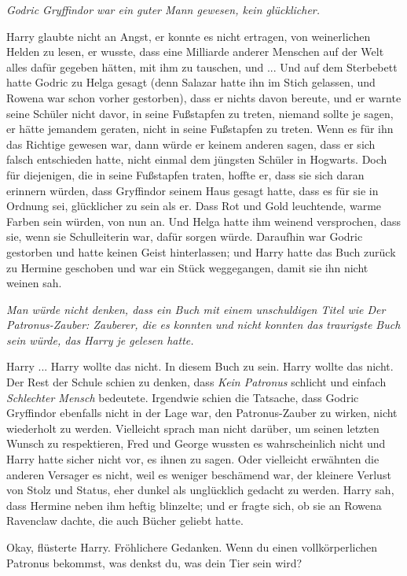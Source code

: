 \emph{Godric Gryffindor war ein guter Mann gewesen, kein glücklicher.}

Harry glaubte nicht an Angst, er konnte es nicht ertragen, von weinerlichen
Helden zu lesen, er wusste, dass eine Milliarde anderer Menschen auf der Welt
alles dafür gegeben hätten, mit ihm zu tauschen, und ... Und auf dem Sterbebett
hatte Godric zu Helga gesagt (denn Salazar hatte ihn im Stich gelassen, und
Rowena war schon vorher gestorben), dass er nichts davon bereute, und er warnte
seine Schüler nicht davor, in seine Fußstapfen zu treten, niemand sollte je
sagen, er hätte jemandem geraten, nicht in seine Fußstapfen zu treten. Wenn es
für ihn das Richtige gewesen war, dann würde er keinem anderen sagen, dass er
sich falsch entschieden hatte, nicht einmal dem jüngsten Schüler in Hogwarts.
Doch für diejenigen, die in seine Fußstapfen traten, hoffte er, dass sie sich
daran erinnern würden, dass Gryffindor seinem Haus gesagt hatte, dass es für sie
in Ordnung sei, glücklicher zu sein als er. Dass Rot und Gold leuchtende, warme
Farben sein würden, von nun an. Und Helga hatte ihm weinend versprochen, dass
sie, wenn sie Schulleiterin war, dafür sorgen würde. Daraufhin war Godric
gestorben und hatte keinen Geist hinterlassen; und Harry hatte das Buch zurück
zu Hermine geschoben und war ein Stück weggegangen, damit sie ihn nicht weinen
sah.

\emph{Man würde nicht denken, dass ein Buch mit einem unschuldigen Titel wie
\glqq{}Der Patronus-Zauber: Zauberer, die es konnten und nicht konnten\grqq{} das
traurigste Buch sein würde, das Harry je gelesen hatte.}

Harry ... Harry wollte das nicht. In diesem Buch zu sein. Harry wollte das nicht.
Der Rest der Schule schien zu denken, dass \glqq{}\emph{Kein Patronus}\grqq{}
schlicht und einfach \glqq{}\emph{Schlechter Mensch}\grqq{} bedeutete. Irgendwie schien
die Tatsache, dass Godric Gryffindor ebenfalls nicht in der Lage war, den
Patronus-Zauber zu wirken, nicht wiederholt zu werden. Vielleicht sprach man
nicht darüber, um seinen letzten Wunsch zu respektieren, Fred und George wussten
es wahrscheinlich nicht und Harry hatte sicher nicht vor, es ihnen zu sagen.
Oder vielleicht erwähnten die anderen Versager es nicht, weil es weniger
beschämend war, der kleinere Verlust von Stolz und Status, eher dunkel als
unglücklich gedacht zu werden. Harry sah, dass Hermine neben ihm heftig
blinzelte; und er fragte sich, ob sie an Rowena Ravenclaw dachte, die auch
Bücher geliebt hatte.

\glqq{}Okay\grqq{}, flüsterte Harry. \glqq{}Fröhlichere Gedanken. Wenn du einen
vollkörperlichen Patronus bekommst, was denkst du, was dein Tier sein wird?\grqq{}

